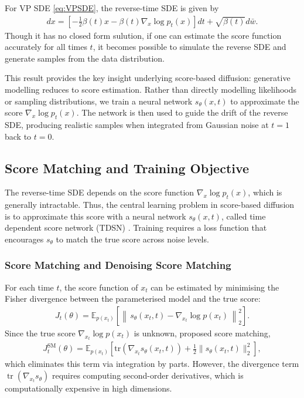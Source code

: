 \documentclass[a4paper,12pt]{article}
\DeclareMathOperator{\tr}{tr} %
\begin{document}
For VP SDE \cref{eq:VPSDE}, the reverse-time SDE is given by
\begin{align*}
    dx=\left[-\frac{1}{2}\beta\!\left(t\right)x-\beta\!\left(t\right)\nabla_x \log p_t(x)\right]dt+\sqrt{\beta\!\left(t\right)}d\bar w.
\end{align*}
Though it has no closed form sulution, if one can estimate the score function accurately for all times \(t\), it becomes possible to simulate the reverse SDE and generate samples from the data distribution.

This result provides the key insight underlying score-based diffusion: generative modelling reduces to score estimation. 
Rather than directly modelling likelihoods or sampling distributions, we train a neural network \(s_\theta(x,t)\) to approximate the score \(\nabla_x \log p_t(x)\). The network is then used to guide the drift of the reverse SDE, producing realistic samples when integrated from Gaussian noise at \(t = 1\) back to \(t = 0\).

\subsection{Score Matching and Training Objective}
The reverse-time SDE depends on the score function \(\nabla_x \log p_t(x)\), which is generally intractable. Thus, the central learning problem in score-based diffusion is to approximate this score with a neural network \(s_\theta(x,t)\), called time dependent score network (TDSN) \citep{song2021ScoreBasedGenerativeModeling}. Training requires a loss function that encourages \(s_\theta\) to match the true score across noise levels.

\subsubsection{Score Matching and Denoising Score Matching}\label{sec:SM-and-DSM}
For each time \(t\), the score function of \(x_t\) can be estimated by minimising the Fisher divergence between the parameterised model and the true score:
\begin{align}\label{eq:FD}
    J_t(\theta)
    = \mathbb{E}_{p(x_t)}\!\left[\left\|\,s_\theta(x_t,t)-\nabla_{x_t}\log p(x_t)\,\right\|_2^2\right].
\end{align}
Since the true score $\nabla_{x_t}\log p(x_t)$ is unknown, \citet{hyvarinenEstimationNonNormalizedStatistical2005} proposed score matching,
\begin{align*}
    J_t^{\text{SM}}(\theta)
    = \mathbb{E}_{p(x_t)}\!\left[
        \mathrm{tr}\!\left(\nabla_{x_t} s_\theta(x_t,t)\right)
        + \frac{1}{2}\|s_\theta(x_t,t)\|_2^2
    \right],
\end{align*}
which eliminates this term via integration by parts. However, the divergence term \(\tr(\nabla_{x_t}s_\theta)\) requires computing second-order derivatives, which is computationally expensive in high dimensions.
\end{document}
